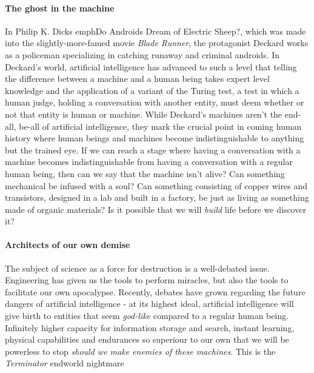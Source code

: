 
\paragraph{The ghost in the machine}

In Philip K. Dicks emph{Do Androids Dream of Electric Sheep?}, which was made into the slightly-more-famed movie \emph{Blade Runner}, the protagonist Deckard works as a policeman specializing in catching runaway and criminal androids. In Deckard's world, artificial intelligence has advanced to such a level that telling the difference between a machine and a human being takes expert level knowledge and the application of a variant of the Turing test, a test in which a human judge, holding a conversation with another entity, must deem whether or not that entity is human or machine. 
While Deckard's machines aren't the end-all, be-all of artificial intelligence, they mark the crucial point in coming human history where human beings and machines become indistinguishable to anything but the trained eye. If we can reach a stage where having a conversation with a machine becomes indistinguishable from having a conversation with a regular human being, then can we say that the machine isn't alive? Can something mechanical be infused with a soul? Can something consisting of copper wires and transistors, designed in a lab and built in a factory, be just as living as something made of organic materials? Is it possible that we will \emph{build} life before we discover it?

\paragraph{Architects of our own demise}
The subject of science as a force for destruction is a well-debated issue. Engineering has given us the tools to perform miracles, but also the tools to facilitate our own apocalypse. Recently, debates have grown regarding the future dangers of artificial intelligence - at its highest ideal, artificial intelligence will give birth to entities that seem \emph{god-like} compared to a regular human being. Infinitely higher capacity for information storage and search, instant learning, physical capabilities and endurances so superiour to our own that we will be powerless to stop \emph{should we make enemies of these machines}. This is the \emph{Terminator} endworld nightmare